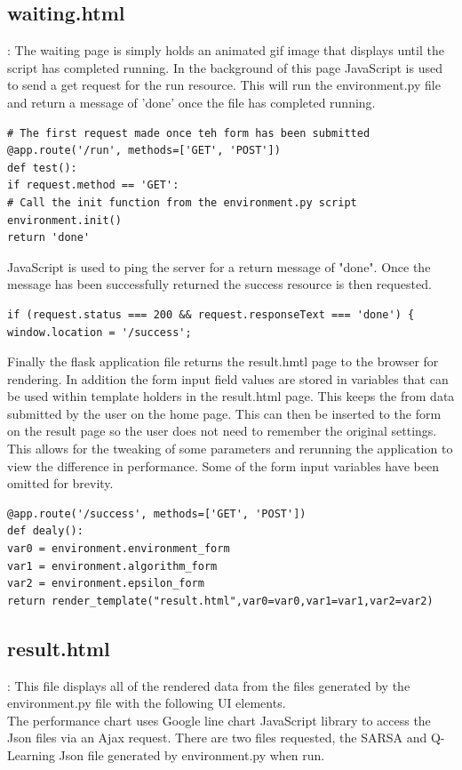 \subsection{waiting.html}:
The waiting page is simply holds an animated gif image that displays until the script has completed running.
In the background of this page JavaScript is used to send a get request for the run resource. This will run the environment.py file and return a message of 'done' once the file has completed running.
\begin{verbatim}
# The first request made once teh form has been submitted
@app.route('/run', methods=['GET', 'POST'])
def test():
if request.method == 'GET':
# Call the init function from the environment.py script
environment.init()
return 'done'
\end{verbatim}

JavaScript is used to ping the server for a return message of "done". Once the message has been successfully returned the success resource is then requested.
\begin{verbatim}
if (request.status === 200 && request.responseText === 'done') {
window.location = '/success';
\end{verbatim}
Finally the flask application file returns the result.hmtl page to the browser for rendering. In addition the form input field values are stored in variables that can be used within template holders in the result.html page. This keeps the from data submitted by the user on the home page. This can then be inserted to the form on the result page so the user does not need to remember the original settings. This allows for the tweaking of some parameters and rerunning the application to view the difference in performance. Some of the form input variables have been omitted for brevity.
\begin{verbatim}
@app.route('/success', methods=['GET', 'POST'])
def dealy():
var0 = environment.environment_form
var1 = environment.algorithm_form
var2 = environment.epsilon_form
return render_template("result.html",var0=var0,var1=var1,var2=var2)
\end{verbatim}


\subsection{result.html}: This file displays all of the rendered data from the files generated by the environment.py file with the following UI elements.\\
The performance chart uses Google line chart JavaScript library to access the Json files via an Ajax request. There are two files requested, the SARSA and Q-Learning Json file generated by environment.py when run.
